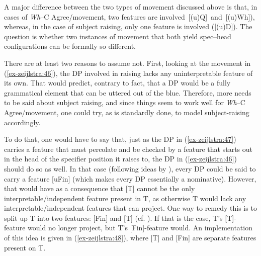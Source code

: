 \documentclass[output=paper
,modfonts
,nonflat]{langsci/langscibook}
\begin{document}
\noindent A major difference between the two types of movement discussed above is that, in cases of \textit{Wh}--C Agree/movement, two features are involved~[(u)Q]~and~[(u)Wh]), whereas, in the case of subject raising, only one feature is involved ([(u)D]). The question is whether two instances of movement that both yield spec–head configurations can be formally so different. 

There are at least two reasons to assume not. First, looking at the movement in (\ref{ex-zeijlstra:46}), the DP involved in raising lacks any uninterpretable feature of its own. That would predict, contrary to fact, that a DP would be a fully grammatical element that can be uttered out of the blue. Therefore, more needs to be said about subject raising, and since things seem to work well for \textit{Wh}–C Agree/movement, one could try, as is standardly done, to model subject-raising accordingly.

To do that, one would have to say that, just as the DP in (\ref{ex-zeijlstra:47}) carries a feature that must percolate and be checked by a feature that starts out in the head of the specifier position it raises to, the DP in (\ref{ex-zeijlstra:46}) should do so as well. In that case (following ideas by \citealt{Pesetsky_Torrego2004, Pesetsky_Torrego2007}), every DP could be said to carry a feature [uFin] (which makes every DP essentially a nominative). However, that would have as a consequence that [T] cannot be the only interpretable/independent feature present in T, as otherwise T would lack any interpretable/independent features that can project. One way to remedy this is to split up T into two features: [Fin] and [T] (cf. \citealt{Koeneman_Zeijlstra2017}). If that is the case, T’s [T]-feature would no longer project, but T’s [Fin]-feature would. An implementation of this idea is given in (\ref{ex-zeijlstra:48}), where [T] and [Fin] are separate features present on T. 
\end{document}
